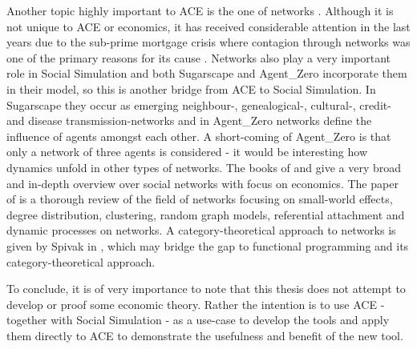 Another topic highly important to ACE is the one of networks \cite{wilhite_economic_2006}. Although it is not unique to ACE or economics, it has received considerable attention in the last years due to the sub-prime mortgage crisis where contagion through networks was one of the primary reasons for its cause \cite{glasserman_contagion_2015}. Networks also play a very important role in Social Simulation and both Sugarscape \cite{epstein_growing_1996} and Agent\_Zero \cite{epstein_agent_zero:_2014} incorporate them in their model, so this is another bridge from ACE to Social Simulation. In Sugarscape they occur as emerging neighbour-, genealogical-, cultural-, credit- and disease transmission-networks and in Agent\_Zero networks define the influence of agents amongst each other. A short-coming of Agent\_Zero is that only a network of three agents is considered - it would be interesting how dynamics unfold in other types of networks. The books of \cite{jackson_social_2008} and \cite{easley_networks_2010} give a very broad and in-depth overview over social networks with focus on economics. The paper of \cite{newman_structure_2003} is a thorough review of the field of networks focusing on small-world effects, degree distribution, clustering, random graph models, referential attachment and dynamic processes on networks. A category-theoretical approach to networks is given by Spivak in \cite{spivak_higher-dimensional_2009}, which may bridge the gap to functional programming and its category-theoretical approach.

To conclude, it is of very importance to note that this thesis does not attempt to develop or proof some economic theory. Rather the intention is to use ACE  - together with Social Simulation - as a use-case to develop the tools and apply them directly to ACE to demonstrate the usefulness and benefit of the new tool.